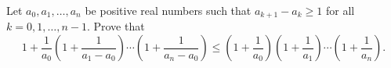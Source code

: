 Let \(a_0,a_1,\dots,a_n\) be positive real numbers such that \(a_{k+1}-a_k \geq 1\) for all \(k=0,1,\dots,n-1.\) Prove that
\[1+\frac{1}{a_0} \left( 1+\frac1{a_1-a_0}\right)\cdots\left(1+\frac1{a_n-a_0}\right)\leq \left(1+\frac1{a_0}\right) \left(1+\frac1{a_1}\right)\cdots \left(1+\frac1{a_n}\right).\]